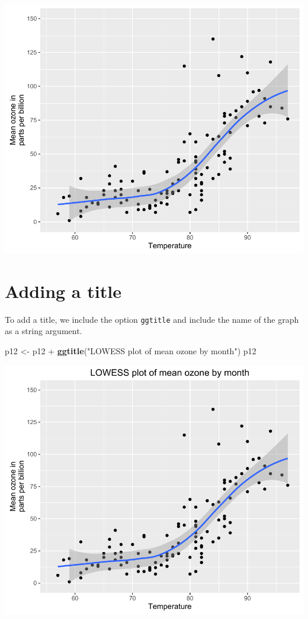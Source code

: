 \documentclass[]{article}
\newenvironment{Shaded}{\begin{snugshade}}{\end{snugshade}}
\newcommand{\KeywordTok}[1]{\textcolor[rgb]{0.13,0.29,0.53}{\textbf{{#1}}}}
\newcommand{\StringTok}[1]{\textcolor[rgb]{0.31,0.60,0.02}{{#1}}}
\newcommand{\NormalTok}[1]{{#1}}
\begin{document}
\begin{center}\includegraphics{12_Lowess_Plots_pdf/lowess_7-1} \end{center}

\section{Adding a title}\label{adding-a-title}

To add a title, we include the option \texttt{ggtitle} and include the
name of the graph as a string argument.

\begin{Shaded}
\begin{Highlighting}[]
\NormalTok{p12 <-}\StringTok{ }\NormalTok{p12 +}\StringTok{ }\KeywordTok{ggtitle}\NormalTok{(}\StringTok{"LOWESS plot of mean ozone by month"}\NormalTok{)}
\NormalTok{p12}
\end{Highlighting}
\end{Shaded}

\begin{center}\includegraphics{12_Lowess_Plots_pdf/lowess_8-1} \end{center}
\end{document}
